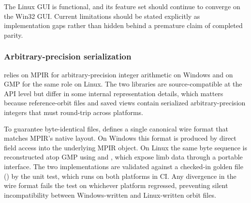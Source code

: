 The Linux GUI is functional, and its feature set should continue to converge on
the Win32 GUI. Current limitations should be stated explicitly as implementation
gaps rather than hidden behind a premature claim of completed parity.

\subsubsection{Arbitrary-precision serialization}
\label{subsec:mpir-portability}

\FractalShark{} relies on MPIR for arbitrary-precision integer arithmetic on
Windows and on GMP for the same role on Linux. The two libraries are
source-compatible at the API level but differ in some internal representation
details, which matters because reference-orbit files and saved views contain
serialized arbitrary-precision integers that must round-trip across platforms.

To guarantee byte-identical files, \FractalShark{} defines a single canonical
wire format that matches MPIR's native  layout. On
Windows this format is produced by direct field access into the underlying
MPIR object. On Linux the same byte sequence is reconstructed atop GMP using
 and , which expose limb data through a
portable interface. The two implementations are validated against a checked-in
golden file () by the 
unit test, which runs on both platforms in CI. Any divergence in the wire
format fails the test on whichever platform regressed, preventing silent
incompatibility between Windows-written and Linux-written orbit files.
